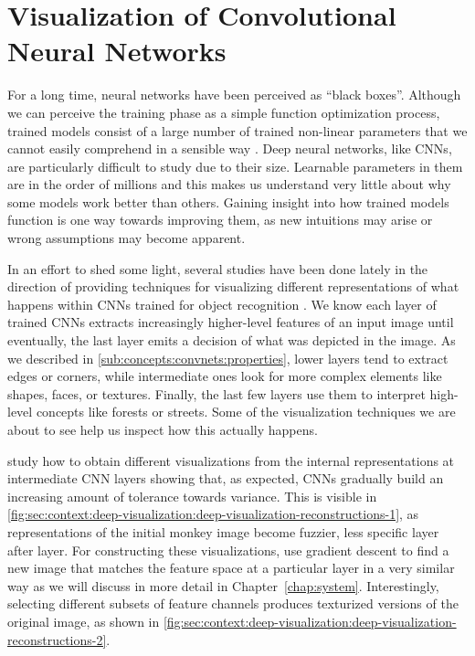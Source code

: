 \section{Visualization of Convolutional Neural Networks}
\label{sec:context:deep-visualization}

For a long time, neural networks have been perceived as ``black boxes''.
Although we can perceive the training phase as a simple function optimization process, trained models consist of a large number of trained non-linear parameters that we cannot easily comprehend in a sensible way \cite{Yosinski2015}.
Deep neural networks, like CNNs, are particularly difficult to study due to their size.
Learnable parameters in them are in the order of millions and this makes us understand very little about why some models work better than others.
Gaining insight into how trained models function is one way towards improving them, as new intuitions may arise or wrong assumptions may become apparent.

In an effort to shed some light, several studies have been done lately in the direction of providing techniques for visualizing different representations of what happens within CNNs trained for object recognition \cite{Dosovitskiy2015,Yosinski2015,Zeiler2014}.
We know each layer of trained CNNs extracts increasingly higher-level features of an input image until eventually, the last layer emits a decision of what was depicted in the image.
As we described in \autoref{sub:concepts:convnets:properties}, lower layers tend to extract edges or corners, while intermediate ones look for more complex elements like shapes, faces, or textures.
Finally, the last few layers use them to interpret high-level concepts like forests or streets.
Some of the visualization techniques we are about to see help us inspect how this actually happens.

\citet{Mahendran2014} study how to obtain different visualizations from the internal representations at intermediate CNN layers showing that, as expected, CNNs gradually build an increasing amount of tolerance towards variance.
This is visible in \autoref{fig:sec:context:deep-visualization:deep-visualization-reconstructions-1}, as representations of the initial monkey image become fuzzier, less specific layer after layer.
For constructing these visualizations, \citeauthor{Mahendran2014} use gradient descent to find a new image that matches the feature space at a particular layer in a very similar way as we will discuss in more detail in Chapter~\ref{chap:system}.
Interestingly, selecting different subsets of feature channels produces texturized versions of the original image, as shown in \autoref{fig:sec:context:deep-visualization:deep-visualization-reconstructions-2}.

